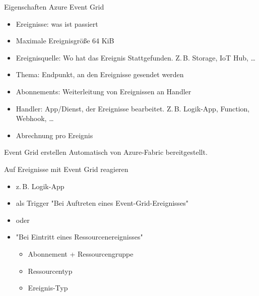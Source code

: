 \begin{flashcard}[Definition]{Eigenschaften Azure Event Grid}
    \begin{itemize}
        \item Ereignisse: was ist passiert
        \item Maximale Ereignisgröße 64 KiB
        \item Ereignisquelle: Wo hat das Ereignis Stattgefunden.\newline
            Z.\,B. Storage, IoT Hub, \ldots
        \item Thema: Endpunkt, an den Ereignisse gesendet werden
        \item Abonnements: Weiterleitung von Ereignissen an Handler
        \item Handler: App/Dienst, der Ereignisse bearbeitet.\newline
            Z.\,B. Logik-App, Function, Webhook, \ldots
        \item Abrechnung pro Ereignis
    \end{itemize}
\end{flashcard}

\begin{flashcard}[Definition]{Event Grid erstellen}
    Automatisch von Azure-Fabric bereitgestellt.
\end{flashcard}

\begin{flashcard}[Definition]{Auf Ereignisse mit Event Grid reagieren}
    \begin{itemize}
        \item z.\,B. Logik-App
        \item als Trigger "Bei Auftreten eines Event-Grid-Ereignisses"
        \item[] oder
        \item "Bei Eintritt eines Ressourcenereignisses"
            \begin{itemize}
                \item Abonnement + Ressourcengruppe
                \item Ressourcentyp
                \item Ereignis-Typ
            \end{itemize}
    \end{itemize}
\end{flashcard}

